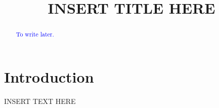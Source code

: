 \documentclass[11pt,a4paper]{amsbook}
\theoremstyle{definition}
\numberwithin{equation}{section}
\numberwithin{figure}{section}
\begin{document}
\title{INSERT TITLE HERE}




\begin{abstract}
\textcolor{blue}{To write later.}
\end{abstract}

\maketitle

\tableofcontents



\chapter{Introduction}

INSERT TEXT HERE


% 
% 
\end{document}
